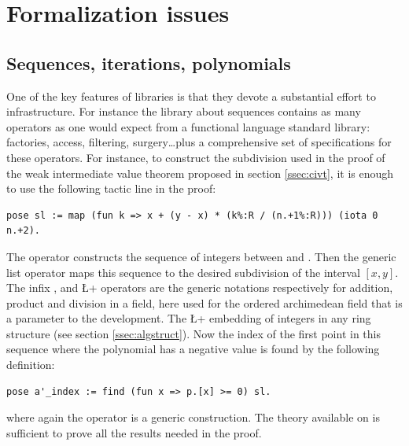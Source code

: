 \documentclass{mscs}
\begin{document}
\section{Formalization issues}
\label{sec:formal}

\subsection{Sequences, iterations, polynomials}\label{ssec:modularity}

One of the key features of \ssr{} libraries is that they devote a
substantial effort to infrastructure. For instance the library about
sequences contains as many operators as one would expect from a
functional language standard library: factories, access, filtering,
surgery\dots plus a comprehensive set of specifications for these
operators. For instance, to construct the subdivision used in the proof of the
weak intermediate value theorem proposed in section \ref{ssec:civt},
it is enough to use the following tactic line in the proof:
\begin{lstlisting}
pose sl := map (fun k => x + (y - x) * (k%:R / (n.+1%:R))) (iota 0 n.+2).
\end{lstlisting}
The  operator constructs the sequence of integers between
 and . Then the  generic list operator maps this
sequence to the desired subdivision of the interval $[x, y]$. The
infix \C{+}, \C{*} and \L+\+ operators are the generic notations
  respectively for addition, product and division in a field, here
  used for the ordered archimedean field that is a parameter to the
  development. The \L+%
embedding of
integers in any ring structure (see section \ref{ssec:algstruct}).
Now the index of the first point in this sequence where the polynomial has a
negative value is found by the following definition:
\begin{lstlisting}
pose a'_index := find (fun x => p.[x] >= 0) sl.
\end{lstlisting}
where again the  operator is a generic construction. The
theory available on  is sufficient to prove all the results
needed in the proof.
\end{document}
